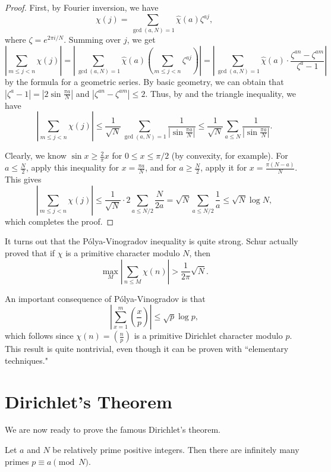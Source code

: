 \documentclass{scrartcl}
\begin{document}
\begin{proof}
	First, by Fourier inversion, we have 
	$$\chi(j) = \sum_{\gcd(a, N)=1} \widehat{\chi}(a) \zeta^{aj},$$
	where $\zeta = e^{2\pi i/N}$. 
	Summing over $j$, we get 
	$$\left | \sum_{m\le j<n} \chi(j)\right | =
	\left | \sum_{\gcd(a, N)=1}\widehat{\chi}(a)\left(\sum_{m\le j<n} \zeta^{aj}\right)\right | 
	= \left |\sum_{\gcd(a, N)=1}\widehat{\chi}(a) \cdot \frac{\zeta^{an}-\zeta^{am}}{\zeta^a-1}\right |$$
	by the formula for a geometric series. 
	By basic geometry, we can obtain that $|\zeta^a-1| = |2\sin \frac{\pi a}{N}|$ and $|\zeta^{an}-\zeta^{am}|\le 2$. 
	Thus, by  and the triangle inequality, we have 
	$$\left |\sum_{m\le j<n} \chi(j)\right | \le \frac{1}{\sqrt{N}} \sum_{\gcd(a, N)=1} \frac{1}{|\sin \frac{\pi a}{N}|}
	\le \frac{1}{\sqrt{N}} \sum_{a\le N} \frac{1}{|\sin \frac{\pi a}{N}|}.$$
	
	Clearly, we know $\sin x\ge \frac{2}{\pi} x$ for $0\le x\le \pi/2$ (by convexity, for example). 
	For $a\le \frac{N}{2}$, apply this inequality for $x=\frac{\pi a}{N}$, and for $a\ge \frac{N}{2}$, apply it 
	for $x=\frac{\pi(N-a)}{N}$. 
	This gives 
	$$\left |\sum_{m\le j<n} \chi(j)\right | \le \frac{1}{\sqrt{N}} \cdot 2\sum_{a\le N/2} \frac{N}{2a}
	= \sqrt{N} \sum_{a\le N/2} \frac{1}{a} \le \sqrt{N}\log N,$$
	which completes the proof. 
\end{proof}

\begin{remark}
	It turns out that the P\'olya-Vinogradov inequality is quite strong. 
	Schur actually proved that if $\chi$ is a primitive character modulo $N$, then 
	$$\max_{M} \left | \sum_{n\le M} \chi(n)\right | >\frac{1}{2\pi} \sqrt{N}.$$
\end{remark}

An important consequence of P\'olya-Vinogradov is that 
$$\left | \sum_{x=1}^m \left(\frac{x}{p}\right)\right| \le \sqrt{p}\log p,$$
which follows since $\chi(n) = (\frac{n}{p})$ is a primitive Dirichlet character modulo $p$. 
This result is quite nontrivial, even though it can be proven with ``elementary techniques." 

\section{Dirichlet's Theorem}

We are now ready to prove the famous Dirichlet's theorem. 

\begin{theorem} [Dirichlet]
	\label{thm:dirichlet}
	Let $a$ and $N$ be relatively prime positive integers. 
	Then there are infinitely many primes $p\equiv a\pmod N$. 
\end{theorem}
\end{document}
